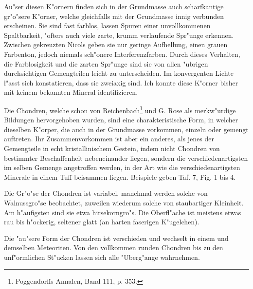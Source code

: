\documentclass[a4paper, 11pt, oneside, polutonikogreek, german]{article}
\begin{document}
Au"ser diesen K"ornern finden sich in der Grundmasse auch scharfkantige gr"o"sere K"orner, welche gleichfalls mit der Grundmasse innig verbunden erscheinen. Sie sind fast farblos, lassen Spuren einer unvollkommenen Spaltbarkeit, "ofters auch viele zarte, krumm verlaufende Spr"unge erkennen. Zwischen gekreuzten Nicols geben sie nur geringe Aufhellung, einen grauen Farbenton, jedoch niemals sch"onere Interferenzfarben. Durch dieses Verhalten, die Farblosigkeit und die zarten Spr"unge sind sie von allen "ubrigen durchsichtigen Gemengteilen leicht zu unterscheiden. Im konvergenten Lichte l"asst sich konstatieren, dass sie zweiaxig sind. Ich konnte diese K"orner bisher mit keinem bekannten Mineral identifizieren.

Die Chondren, welche schon von Reichenbach\footnote{Poggendorffs Annalen, Band 111, p. 353.} und G. Rose als merkw"urdige Bildungen hervorgehoben wurden, sind eine charakteristische Form, in welcher dieselben K"orper, die auch in der Grundmasse vorkommen, einzeln oder gemengt auftreten. Ihr Zusammenvorkommen ist aber ein anderes, als jenes der Gemengteile in echt kristallinischem Gestein, indem nicht Chondren von bestimmter Beschaffenheit nebeneinander liegen, sondern die verschiedenartigsten im selben Gemenge angetroffen werden, in der Art wie die verschiedenartigsten Minerale in einem Tuff beisammen liegen. Beispiele geben Taf. 7, Fig. 1 bis 4.

Die Gr"o"se der Chondren ist variabel, manchmal werden solche von Walnussgro"se beobachtet, zuweilen wiederum solche von staubartiger Kleinheit. Am h"aufigsten sind sie etwa hirsekorngro"s. Die Oberfl"ache ist meistens etwas rau bis h"ockerig, seltener glatt (an harten faserigen K"ugelchen).

Die "au"sere Form der Chondren ist verschieden und wechselt in einem und demselben Meteoriten. Von den vollkommen runden Chondren bis zu den unf"ormlichen St"ucken lassen sich alle "Uberg"ange wahrnehmen.
\end{document}
